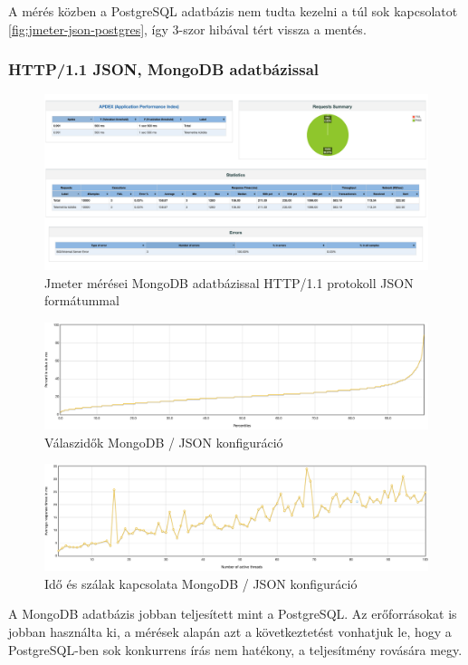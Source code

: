 A mérés közben a PostgreSQL adatbázis nem tudta kezelni a túl sok kapcsolatot \ref{fig:jmeter-json-postgres}, így 3-szor hibával tért vissza a mentés.

\subsubsection{HTTP/1.1 JSON, MongoDB adatbázissal}
\begin{figure}[hbt!]
    \centering
    \includegraphics[scale=0.2]{images/jmeter-json-postgres}
    \caption{Jmeter mérései MongoDB adatbázissal HTTP/1.1 protokoll JSON formátummal}
    \label{fig:jmeter-json-mongo}
\end{figure}

\begin{figure}[hbt!]
    \centering
    \includegraphics[scale=0.3]{images/json-mongo-response-times}
    \caption{Válaszidők MongoDB / JSON konfiguráció}
    \label{fig:json-mongo-response-times}
\end{figure}

\begin{figure}[hbt!]
    \centering
    \includegraphics[scale=0.3]{images/json-mongo-time-vs-threads}
    \caption{Idő és szálak kapcsolata MongoDB / JSON konfiguráció}
    \label{fig:json-mongo-time-vs-threads}
\end{figure}
\begin{remark}
    A MongoDB adatbázis jobban teljesített mint a PostgreSQL.
    Az erőforrásokat is jobban használta ki, a mérések alapán azt a következtetést vonhatjuk le, hogy a PostgreSQL-ben sok konkurrens írás nem hatékony, a teljesítmény rovására megy.
\end{remark}

